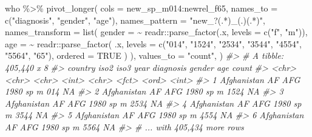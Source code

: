 \documentclass[
]{book}
\newenvironment{Shaded}{\begin{snugshade}}{\end{snugshade}}
\newcommand{\AttributeTok}[1]{\textcolor[rgb]{0.77,0.63,0.00}{#1}}
\newcommand{\CommentTok}[1]{\textcolor[rgb]{0.56,0.35,0.01}{\textit{#1}}}
\newcommand{\ConstantTok}[1]{\textcolor[rgb]{0.00,0.00,0.00}{#1}}
\newcommand{\FunctionTok}[1]{\textcolor[rgb]{0.00,0.00,0.00}{#1}}
\newcommand{\NormalTok}[1]{#1}
\newcommand{\SpecialCharTok}[1]{\textcolor[rgb]{0.00,0.00,0.00}{#1}}
\newcommand{\StringTok}[1]{\textcolor[rgb]{0.31,0.60,0.02}{#1}}
\begin{document}
\begin{Shaded}
\begin{Highlighting}[]
\NormalTok{who }\SpecialCharTok{\%\textgreater{}\%} \FunctionTok{pivot\_longer}\NormalTok{(}
  \AttributeTok{cols =}\NormalTok{ new\_sp\_m014}\SpecialCharTok{:}\NormalTok{newrel\_f65,}
  \AttributeTok{names\_to =} \FunctionTok{c}\NormalTok{(}\StringTok{"diagnosis"}\NormalTok{, }\StringTok{"gender"}\NormalTok{, }\StringTok{"age"}\NormalTok{), }
  \AttributeTok{names\_pattern =} \StringTok{"new\_?(.*)\_(.)(.*)"}\NormalTok{,}
  \AttributeTok{names\_transform =} \FunctionTok{list}\NormalTok{(}
    \AttributeTok{gender =} \SpecialCharTok{\textasciitilde{}}\NormalTok{ readr}\SpecialCharTok{::}\FunctionTok{parse\_factor}\NormalTok{(.x, }\AttributeTok{levels =} \FunctionTok{c}\NormalTok{(}\StringTok{"f"}\NormalTok{, }\StringTok{"m"}\NormalTok{)),}
    \AttributeTok{age =} \SpecialCharTok{\textasciitilde{}}\NormalTok{ readr}\SpecialCharTok{::}\FunctionTok{parse\_factor}\NormalTok{(}
\NormalTok{      .x,}
      \AttributeTok{levels =} \FunctionTok{c}\NormalTok{(}\StringTok{"014"}\NormalTok{, }\StringTok{"1524"}\NormalTok{, }\StringTok{"2534"}\NormalTok{, }\StringTok{"3544"}\NormalTok{, }\StringTok{"4554"}\NormalTok{, }\StringTok{"5564"}\NormalTok{, }\StringTok{"65"}\NormalTok{), }
      \AttributeTok{ordered =} \ConstantTok{TRUE}
\NormalTok{    )}
\NormalTok{  ),}
  \AttributeTok{values\_to =} \StringTok{"count"}\NormalTok{,}
\NormalTok{)}
\CommentTok{\#\textgreater{} \# A tibble: 405,440 x 8}
\CommentTok{\#\textgreater{}   country     iso2  iso3   year diagnosis gender age   count}
\CommentTok{\#\textgreater{}   \textless{}chr\textgreater{}       \textless{}chr\textgreater{} \textless{}chr\textgreater{} \textless{}int\textgreater{} \textless{}chr\textgreater{}     \textless{}fct\textgreater{}  \textless{}ord\textgreater{} \textless{}int\textgreater{}}
\CommentTok{\#\textgreater{} 1 Afghanistan AF    AFG    1980 sp        m      014      NA}
\CommentTok{\#\textgreater{} 2 Afghanistan AF    AFG    1980 sp        m      1524     NA}
\CommentTok{\#\textgreater{} 3 Afghanistan AF    AFG    1980 sp        m      2534     NA}
\CommentTok{\#\textgreater{} 4 Afghanistan AF    AFG    1980 sp        m      3544     NA}
\CommentTok{\#\textgreater{} 5 Afghanistan AF    AFG    1980 sp        m      4554     NA}
\CommentTok{\#\textgreater{} 6 Afghanistan AF    AFG    1980 sp        m      5564     NA}
\CommentTok{\#\textgreater{} \# ... with 405,434 more rows}
\end{Highlighting}
\end{Shaded}
\end{document}
